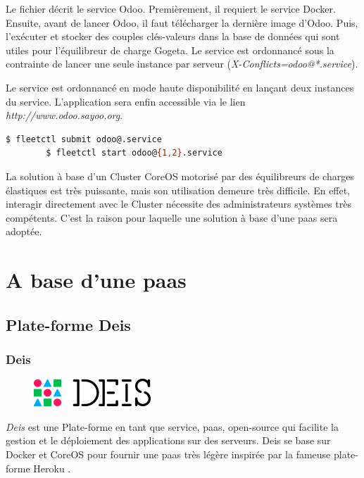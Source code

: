 \begin{onehalfspace}
Le fichier décrit le service Odoo. Premièrement, il requiert le service Docker. Ensuite, avant de lancer Odoo, il faut télécharger la dernière image d'Odoo. Puis, l'exécuter et stocker des couples clés-valeurs dans la base de données qui sont utiles pour l'équilibreur de charge Gogeta. Le service est ordonnancé sous la contrainte de lancer une seule instance par serveur (\emph{X-Conflicts=odoo@*.service}).

Le service est ordonnancé en mode haute disponibilité en lançant deux instances du service. L'application sera enfin accessible via le lien \emph{http://www.odoo.sayoo.org}.

	\begin{lstlisting}[language=bash,caption=Ordonnancement de deux instances]
		$ fleetctl submit odoo@.service
		$ fleetctl start odoo@{1,2}.service
	\end{lstlisting}

La solution à base d'un Cluster CoreOS motorisé par des équilibreurs de charges élastiques est très puissante, mais son utilisation demeure très difficile. En effet, interagir directement avec le Cluster nécessite des administrateurs systèmes très compétents. C'est la raison pour laquelle une solution à base d'une \acrshort{paas} sera adoptée.


\section{A base d'une \acrshort{paas}}
\subsection{Plate-forme Deis}

\subsubsection*{Deis}

\begin{figure}
\centering
\includegraphics[scale=0.4]{chapitre5/assets/deis}
\end{figure}
\noindent \emph{Deis} est une Plate-forme en tant que service, \acrshort{paas}, open-source qui facilite la gestion et le déploiement des applications sur des serveurs. Deis se base sur Docker et CoreOS pour fournir une \acrshort{paas} très légère inspirée par la fameuse plate-forme Heroku \cite{deis}.



\end{onehalfspace}

